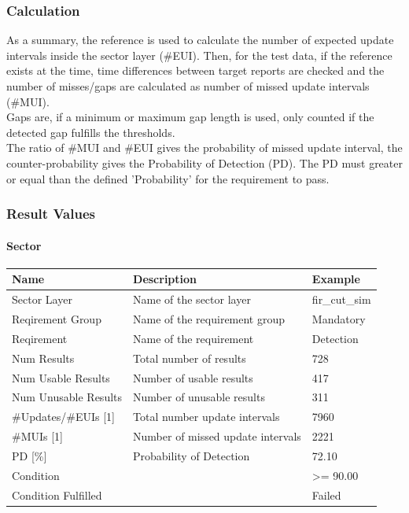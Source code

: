 \subsubsection{Calculation}

As a summary, the reference is used to calculate the number of expected update intervals inside the sector layer (\#EUI). Then, for the test data, if the reference exists at the time, time differences between target reports are checked and the number of misses/gaps are calculated as number of missed update intervals (\#MUI). \\

Gaps are, if a minimum or maximum gap length is used, only counted if the detected gap fulfills the thresholds. \\

The ratio of \#MUI and \#EUI gives the probability of missed update interval, the counter-probability gives the Probability of Detection (PD). The PD must greater or equal than the defined 'Probability' for the requirement to pass.

\subsubsection{Result Values}

\paragraph{Sector}

\begin{center}
 \begin{table}[H]
  \begin{tabularx}{\textwidth}{ | l | X |  l | }
    \hline
    \textbf{Name} & \textbf{Description} & \textbf{Example} \\ \hline
    Sector Layer & Name of the sector layer & fir\_cut\_sim \\ \hline
    Reqirement Group & Name of the requirement group & Mandatory  \\ \hline
    Reqirement & Name of the requirement & Detection  \\ \hline
    Num Results & Total number of results & 728  \\ \hline
    Num Usable Results & Number of usable results & 417  \\ \hline
    Num Unusable Results & Number of unusable results & 311  \\ \hline
    \#Updates/\#EUIs [1] & Total number update intervals & 7960  \\ \hline
    \#MUIs [1] & Number of missed update intervals & 2221  \\ \hline
    PD [\%] & Probability of Detection & 72.10  \\ \hline
    Condition &  & >= 90.00  \\ \hline
    Condition Fulfilled &  & Failed  \\ \hline
\end{tabularx}
\end{table}
\end{center}

